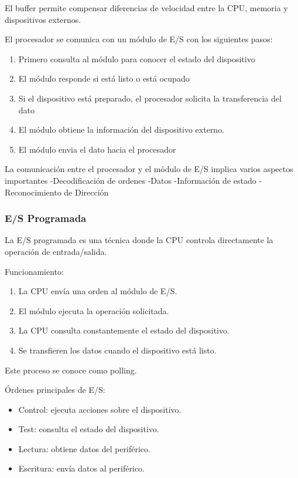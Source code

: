 \documentclass{article}
\begin{document}
El buffer permite compensar diferencias de velocidad entre la CPU, memoria
y dispositivos externos.

El procesador se comunica con un módulo de E/S con los siguientes pasos:
\begin{enumerate}
\item Primero consulta al módulo para conocer el estado del dispositivo
\item El módulo responde si está listo o está ocupado
\item Si el dispositivo está preparado, el procesador solicita la transferencia del dato
\item El módulo obtiene la información del dispositivo externo.
\item El módulo envia el dato hacia el procesador
\end{enumerate}

La comunicación entre el procesador y el módulo de E/S implica varios aspectos importantes
-Decodificación de ordenes
-Datos
-Información de estado
-Reconocimiento de Dirección


\subsubsection{E/S Programada}
\label{sec:org519e7d5}

La E/S programada es una técnica donde la CPU controla directamente la
operación de entrada/salida.

Funcionamiento:
\begin{enumerate}
\item La CPU envía una orden al módulo de E/S.
\item El módulo ejecuta la operación solicitada.
\item La CPU consulta constantemente el estado del dispositivo.
\item Se transfieren los datos cuando el dispositivo está listo.
\end{enumerate}

Este proceso se conoce como polling.

Órdenes principales de E/S:
\begin{itemize}
\item Control: ejecuta acciones sobre el dispositivo.
\item Test: consulta el estado del dispositivo.
\item Lectura: obtiene datos del periférico.
\item Escritura: envía datos al periférico.
\end{itemize}
\end{document}

